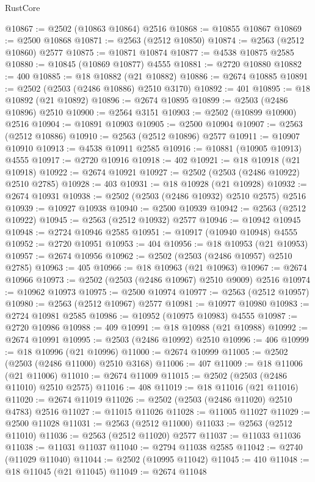 \begin{lexlean}{RustCore}
\begin{coremodule}
@10867 := @2502 (@10863 @10864) @2516
@10868 := @10855 @10867
@10869 := @2500 @10868
@10871 := @2563 (@2512 @10850)
@10874 := @2563 (@2512 @10860) @2577
@10875 := @10871 @10874
@10877 := @4538 @10875 @2585
@10880 := @10845 (@10869 @10877) @4555
@10881 := @2720 @10880
@10882 := 400
@10885 := @18 @10882 (@21 @10882)
@10886 := @2674 @10885
@10891 := @2502 (@2503 (@2486 @10886) @2510 @3170)
@10892 := 401
@10895 := @18 @10892 (@21 @10892)
@10896 := @2674 @10895
@10899 := @2503 (@2486 @10896) @2510
@10900 := @2564 @3151
@10903 := @2502 (@10899 @10900) @2516
@10904 := @10891 @10903
@10905 := @2500 @10904
@10907 := @2563 (@2512 @10886)
@10910 := @2563 (@2512 @10896) @2577
@10911 := @10907 @10910
@10913 := @4538 @10911 @2585
@10916 := @10881 (@10905 @10913) @4555
@10917 := @2720 @10916
@10918 := 402
@10921 := @18 @10918 (@21 @10918)
@10922 := @2674 @10921
@10927 := @2502 (@2503 (@2486 @10922) @2510 @2785)
@10928 := 403
@10931 := @18 @10928 (@21 @10928)
@10932 := @2674 @10931
@10938 := @2502 (@2503 (@2486 @10932) @2510 @2575) @2516
@10939 := @10927 @10938
@10940 := @2500 @10939
@10942 := @2563 (@2512 @10922)
@10945 := @2563 (@2512 @10932) @2577
@10946 := @10942 @10945
@10948 := @2724 @10946 @2585
@10951 := @10917 (@10940 @10948) @4555
@10952 := @2720 @10951
@10953 := 404
@10956 := @18 @10953 (@21 @10953)
@10957 := @2674 @10956
@10962 := @2502 (@2503 (@2486 @10957) @2510 @2785)
@10963 := 405
@10966 := @18 @10963 (@21 @10963)
@10967 := @2674 @10966
@10973 := @2502 (@2503 (@2486 @10967) @2510 @9009) @2516
@10974 := @10962 @10973
@10975 := @2500 @10974
@10977 := @2563 (@2512 @10957)
@10980 := @2563 (@2512 @10967) @2577
@10981 := @10977 @10980
@10983 := @2724 @10981 @2585
@10986 := @10952 (@10975 @10983) @4555
@10987 := @2720 @10986
@10988 := 409
@10991 := @18 @10988 (@21 @10988)
@10992 := @2674 @10991
@10995 := @2503 (@2486 @10992) @2510
@10996 := 406
@10999 := @18 @10996 (@21 @10996)
@11000 := @2674 @10999
@11005 := @2502 (@2503 (@2486 @11000) @2510 @3168)
@11006 := 407
@11009 := @18 @11006 (@21 @11006)
@11010 := @2674 @11009
@11015 := @2502 (@2503 (@2486 @11010) @2510 @2575)
@11016 := 408
@11019 := @18 @11016 (@21 @11016)
@11020 := @2674 @11019
@11026 := @2502 (@2503 (@2486 @11020) @2510 @4783) @2516
@11027 := @11015 @11026
@11028 := @11005 @11027
@11029 := @2500 @11028
@11031 := @2563 (@2512 @11000)
@11033 := @2563 (@2512 @11010)
@11036 := @2563 (@2512 @11020) @2577
@11037 := @11033 @11036
@11038 := @11031 @11037
@11040 := @2794 @11038 @2585
@11042 := @2740 (@11029 @11040)
@11044 := @2502 (@10995 @11042)
@11045 := 410
@11048 := @18 @11045 (@21 @11045)
@11049 := @2674 @11048

\end{coremodule}
\end{lexlean}
